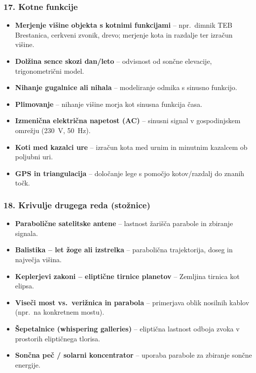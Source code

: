 \documentclass[11pt,a4paper]{article}
\begin{document}
\subsubsection*{17. Kotne funkcije}
\begin{itemize}
  \item \textbf{Merjenje višine objekta s kotnimi funkcijami} -- npr.\ dimnik TEB Brestanica, cerkveni zvonik, drevo; merjenje kota in razdalje ter izračun višine.
  \item \textbf{Dolžina sence skozi dan/leto} -- odvisnost od sončne elevacije, trigonometrični model.
  \item \textbf{Nihanje gugalnice ali nihala} -- modeliranje odmika s sinusno funkcijo.
  \item \textbf{Plimovanje} -- nihanje višine morja kot sinusna funkcija časa.
  \item \textbf{Izmenična električna napetost (AC)} -- sinusni signal v gospodinjskem omrežju (230~V, 50~Hz).
  \item \textbf{Koti med kazalci ure} -- izračun kota med urnim in minutnim kazalcem ob poljubni uri.
  \item \textbf{GPS in triangulacija} -- določanje lege s pomočjo kotov/razdalj do znanih točk.
\end{itemize}

\subsubsection*{18. Krivulje drugega reda (stožnice)}
\begin{itemize}
  \item \textbf{Parabolične satelitske antene} -- lastnost žarišča parabole in zbiranje signala.
  \item \textbf{Balistika -- let žoge ali izstrelka} -- parabolična trajektorija, doseg in največja višina.
  \item \textbf{Keplerjevi zakoni -- eliptične tirnice planetov} -- Zemljina tirnica kot elipsa.
  \item \textbf{Viseči most vs.\ verižnica in parabola} -- primerjava oblik nosilnih kablov (npr.\ na konkretnem mostu).
  \item \textbf{Šepetalnice (whispering galleries)} -- eliptična lastnost odboja zvoka v prostorih eliptičnega tlorisa.
  \item \textbf{Sončna peč / solarni koncentrator} -- uporaba parabole za zbiranje sončne energije.
\end{itemize}
\end{document}

